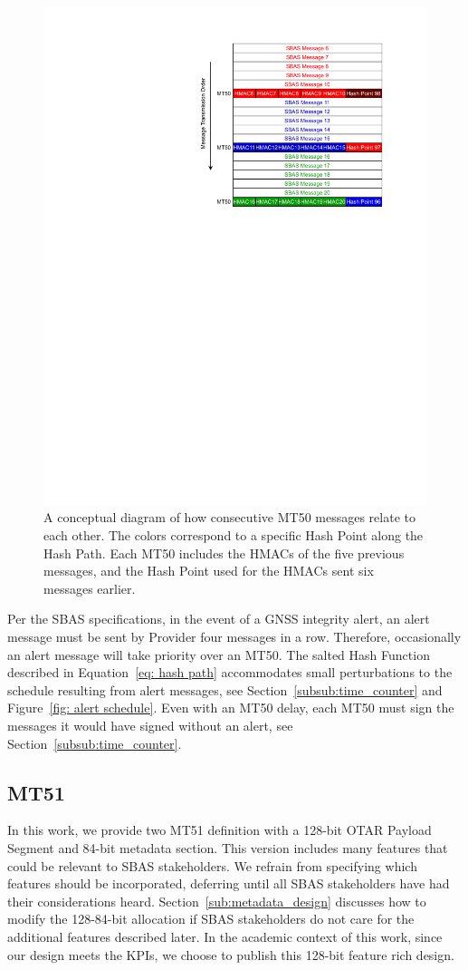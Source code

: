 \documentclass[APA,STIX1COL]{IONjournal/ION-APA Template}
\begin{document}
		\begin{figure}%
			\centering
			\includegraphics[width=0.5\linewidth]{fig/MT50Schedule.pdf}
			\caption{
				A conceptual diagram of how consecutive MT50 messages relate to each other.
				The colors correspond to a specific Hash Point along the Hash Path. Each MT50 includes the HMACs of the five previous messages, and the Hash Point used for the HMACs sent six messages earlier.
			}
			\label{fig: MT50 Schedule}
		\end{figure}

		Per the SBAS specifications, in the event of a GNSS integrity alert, an alert message must be sent by Provider four messages in a row.
		Therefore,  occasionally an alert message will take priority over an MT50.
		The salted Hash Function described in Equation~\eqref{eq: hash path} accommodates small perturbations to the schedule resulting from alert messages, see Section~\ref{subsub:time_counter} and Figure~\ref{fig: alert schedule}.
		Even with an MT50 delay, each MT50 must sign the messages it would have signed without an alert, see Section~\ref{subsub:time_counter}.

	\subsection{MT51} \label{sub:mt51}

		In this work, we provide two MT51 definition with a 128-bit OTAR Payload Segment and 84-bit metadata section.
		This version includes many features that could be relevant to SBAS stakeholders. 
		We refrain from specifying which features should be incorporated, deferring until all SBAS stakeholders have had their considerations heard.
		Section~\ref{sub:metadata_design} discusses how to modify the 128-84-bit allocation if SBAS stakeholders do not care for the additional features described later.
		In the academic context of this work, since our design meets the KPIs, we choose to publish this 128-bit feature rich design.
		
\end{document}
